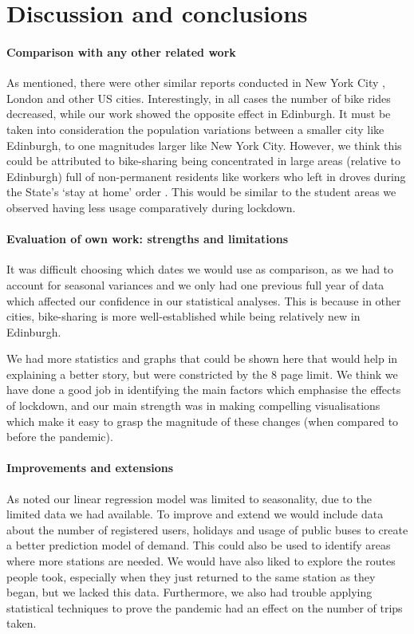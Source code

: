 \documentclass[11pt,a4paper]{article}
\begin{document}
\section{Discussion and conclusions}

\paragraph{Comparison with any other related work}
As mentioned,  there were other similar reports conducted in New York City \cite{TEIXEIRA2020100166}, London \cite{Bike-Association} and other US cities. Interestingly, in all cases the number of bike rides decreased, while our work showed the opposite effect in Edinburgh. It must be taken into consideration the population variations between a smaller city like Edinburgh, to one magnitudes larger like New York City. However, we think this could be attributed to bike-sharing being concentrated in large areas (relative to Edinburgh) full of non-permanent residents like workers who left in droves during the State’s ‘stay at home’ order  \cite{NewYork}. This would be similar to the student areas we observed having less usage comparatively during lockdown.

\paragraph{Evaluation of own work: strengths and limitations}
It was difficult choosing which dates we would use as comparison, as we had to account for seasonal variances and we only had one previous full year of data which affected our confidence in our statistical analyses. This is because in other cities, bike-sharing is more well-established while being relatively new in Edinburgh.

We had more statistics and graphs that could be shown here that would help in explaining a better story, but were constricted by the 8 page limit. We think we have done a good job in identifying the main factors which emphasise the effects of lockdown, and our main strength was in making compelling visualisations which make it easy to grasp the magnitude of these changes (when compared to before the pandemic).

\paragraph{Improvements and extensions}
As noted our linear regression model was limited to seasonality, due to the limited data we had available. To improve and extend we would include data about the number of registered users, holidays and usage of public buses to create a better prediction model of demand. This could also be used to identify areas where more stations are needed. We would have also liked to explore the routes people took, especially when they just returned to the same station as they began, but we lacked this data. Furthermore, we also had trouble applying statistical techniques to prove the pandemic had an effect on the number of trips taken. 
\end{document}
